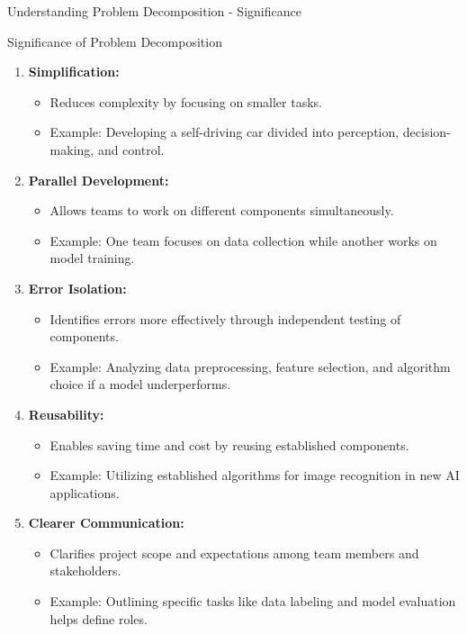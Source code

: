 \documentclass[aspectratio=169]{beamer}
\begin{document}
\begin{frame}[fragile]{Understanding Problem Decomposition - Significance}
    \begin{block}{Significance of Problem Decomposition}
        \begin{enumerate}
            \item \textbf{Simplification:} 
                \begin{itemize}
                    \item Reduces complexity by focusing on smaller tasks.
                    \item Example: Developing a self-driving car divided into perception, decision-making, and control.
                \end{itemize}
            \item \textbf{Parallel Development:} 
                \begin{itemize}
                    \item Allows teams to work on different components simultaneously.
                    \item Example: One team focuses on data collection while another works on model training.
                \end{itemize}
            \item \textbf{Error Isolation:}
                \begin{itemize}
                    \item Identifies errors more effectively through independent testing of components.
                    \item Example: Analyzing data preprocessing, feature selection, and algorithm choice if a model underperforms.
                \end{itemize}
            \item \textbf{Reusability:}
                \begin{itemize}
                    \item Enables saving time and cost by reusing established components.
                    \item Example: Utilizing established algorithms for image recognition in new AI applications.
                \end{itemize}
            \item \textbf{Clearer Communication:}
                \begin{itemize}
                    \item Clarifies project scope and expectations among team members and stakeholders.
                    \item Example: Outlining specific tasks like data labeling and model evaluation helps define roles.
                \end{itemize}
        \end{enumerate}
    \end{block}
\end{frame}
\end{document}
